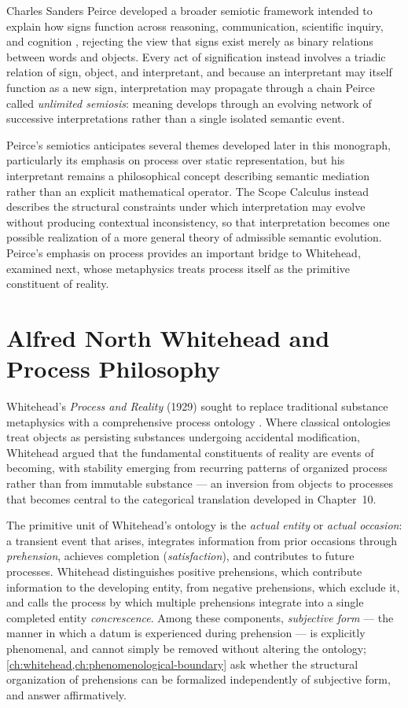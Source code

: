 \documentclass[11pt,twoside,openright]{book}
\numberwithin{equation}{chapter}
\theoremstyle{definition}
\theoremstyle{plain}
\theoremstyle{remark}
\theoremstyle{definition}
\begin{document}
Charles Sanders Peirce developed a broader semiotic framework intended to
explain how signs function across reasoning, communication, scientific
inquiry, and cognition \cite{Peirce1931,Short2007}, rejecting the view
that signs exist merely as binary relations between words and objects.
Every act of signification instead involves a triadic relation of sign,
object, and interpretant, and because an interpretant may itself function
as a new sign, interpretation may propagate through a chain Peirce called
\emph{unlimited semiosis}: meaning develops through an evolving network
of successive interpretations rather than a single isolated semantic
event.

Peirce's semiotics anticipates several themes developed later in this
monograph, particularly its emphasis on process over static
representation, but his interpretant remains a philosophical concept
describing semantic mediation rather than an explicit mathematical
operator. The Scope Calculus instead describes the structural constraints
under which interpretation may evolve without producing contextual
inconsistency, so that interpretation becomes one possible realization of
a more general theory of admissible semantic evolution. Peirce's emphasis
on process provides an important bridge to Whitehead, examined next, whose
metaphysics treats process itself as the primitive constituent of
reality.

\section{Alfred North Whitehead and Process Philosophy}

Whitehead's \emph{Process and Reality} (1929) sought to replace
traditional substance metaphysics with a comprehensive process ontology
\cite{Whitehead1929}. Where classical ontologies treat objects as
persisting substances undergoing accidental modification, Whitehead
argued that the fundamental constituents of reality are events of
becoming, with stability emerging from recurring patterns of organized
process rather than from immutable substance --- an inversion from
objects to processes that becomes central to the categorical translation
developed in Chapter~10.

The primitive unit of Whitehead's ontology is the \emph{actual entity} or
\emph{actual occasion}: a transient event that arises, integrates
information from prior occasions through \emph{prehension}, achieves
completion (\emph{satisfaction}), and contributes to future processes.
Whitehead distinguishes positive prehensions, which contribute information
to the developing entity, from negative prehensions, which exclude it,
and calls the process by which multiple prehensions integrate into a
single completed entity \emph{concrescence}. Among these components,
\emph{subjective form} --- the manner in which a datum is experienced
during prehension --- is explicitly phenomenal, and cannot simply be
removed without altering the ontology; \cref{ch:whitehead,ch:phenomenological-boundary}
ask whether the structural organization of prehensions can be formalized
independently of subjective form, and answer affirmatively.
\end{document}
